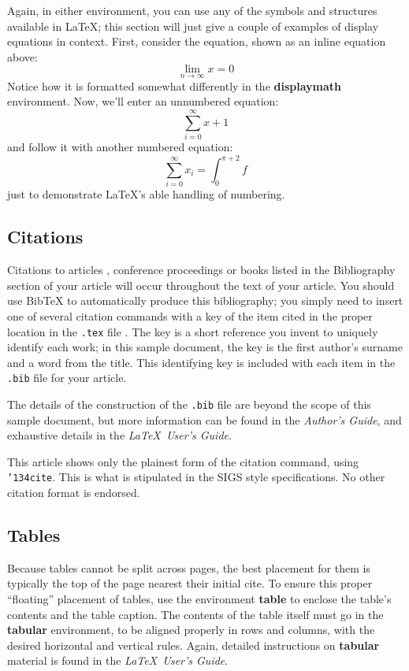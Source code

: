 \documentclass{acm_proc_article-sp}
\begin{document}
Again, in either environment, you can use any of the symbols
and structures available in \LaTeX; this section will just
give a couple of examples of display equations in context.
First, consider the equation, shown as an inline equation above:
\begin{equation}\lim_{n\rightarrow \infty}x=0\end{equation}
Notice how it is formatted somewhat differently in
the \textbf{displaymath}
environment.  Now, we'll enter an unnumbered equation:
\begin{displaymath}\sum_{i=0}^{\infty} x + 1\end{displaymath}
and follow it with another numbered equation:
\begin{equation}\sum_{i=0}^{\infty}x_i=\int_{0}^{\pi+2} f\end{equation}
just to demonstrate \LaTeX's able handling of numbering.

\subsection{Citations}
Citations to articles \cite{bowman:reasoning, clark:pct, braams:babel, herlihy:methodology},
conference
proceedings \cite{clark:pct} or books \cite{salas:calculus, Lamport:LaTeX} listed
in the Bibliography section of your
article will occur throughout the text of your article.
You should use BibTeX to automatically produce this bibliography;
you simply need to insert one of several citation commands with
a key of the item cited in the proper location in
the \texttt{.tex} file \cite{Lamport:LaTeX}.
The key is a short reference you invent to uniquely
identify each work; in this sample document, the key is
the first author's surname and a
word from the title.  This identifying key is included
with each item in the \texttt{.bib} file for your article.

The details of the construction of the \texttt{.bib} file
are beyond the scope of this sample document, but more
information can be found in the \textit{Author's Guide},
and exhaustive details in the \textit{\LaTeX\ User's
Guide}\cite{Lamport:LaTeX}.

This article shows only the plainest form
of the citation command, using \texttt{{\char'134}cite}.
This is what is stipulated in the SIGS style specifications.
No other citation format is endorsed.

\subsection{Tables}
Because tables cannot be split across pages, the best
placement for them is typically the top of the page
nearest their initial cite.  To
ensure this proper ``floating'' placement of tables, use the
environment \textbf{table} to enclose the table's contents and
the table caption.  The contents of the table itself must go
in the \textbf{tabular} environment, to
be aligned properly in rows and columns, with the desired
horizontal and vertical rules.  Again, detailed instructions
on \textbf{tabular} material
is found in the \textit{\LaTeX\ User's Guide}.
\end{document}
